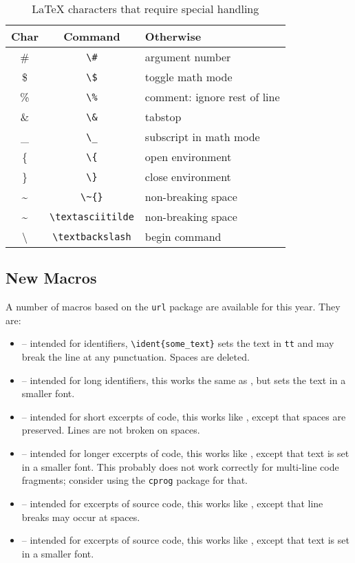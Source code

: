 \documentclass[final]{ols}
\begin{document}
\begin{table}[!th]
\begin{shaded}
\centering
\begin{small}
\begin{tabular}[b]{c|c|p{2.3cm}}
Char & Command & Otherwise \\
\hline
\# & \texttt{{\textbackslash}\#} & argument number \tabularnewline
\hline
\$  & \texttt{{\textbackslash}\$} & toggle math mode \tabularnewline
\hline
\%  & \texttt{{\textbackslash}\%} & comment: ignore rest of line \tabularnewline
\hline
\&  & \texttt{{\textbackslash}\&} & tabstop \tabularnewline
\hline
\_  & \texttt{{\textbackslash}{\_}} & subscript in math mode \tabularnewline
\hline
\{ & \texttt{{\textbackslash}\{} & open environment \tabularnewline
\hline
\} & \texttt{{\textbackslash}\}} & close environment \tabularnewline
\hline
{\~{}}       & \texttt{{\textbackslash}{\~{}}\{\}} & non-breaking space \tabularnewline
{\textasciitilde}       & \texttt{{\textbackslash}textasciitilde} & non-breaking space \tabularnewline
\hline
{\textbackslash} & \texttt{{\textbackslash}textbackslash} & begin command \tabularnewline
\end{tabular}
\end{small}
\caption{{\LaTeX} characters that require special handling}
\label{lockhart-tab1}
\end{shaded}
\end{table}

\subsection{New Macros}\label{lockhart-newmacros}

A number of macros based on the \texttt{url} package are available
for this year.  They are:
\begin{itemize}
\item {} -- intended for identifiers,
  \texttt{{\textbackslash}ident\{some\_text\}} sets the text in
  \texttt{tt} and may break the line at any punctuation.  Spaces are deleted.
\item {} -- intended for long identifiers, this works the
  same as , but sets the text in a smaller font.
\item {} -- intended for short excerpts of code, this works
  like , except that spaces are preserved.  Lines are not
  broken on spaces.
\item {} -- intended for longer excerpts of code, this works
  like , except that text is set in a smaller font.  This
  probably does not work correctly for multi-line code fragments;
  consider using the \texttt{cprog} package for that.
\item {} -- intended for excerpts of source code, this works
  like , except that line breaks may occur at spaces.
\item {} -- intended for excerpts of source code, this works
  like , except that text is set in a smaller font.
\end{itemize}
\end{document}
